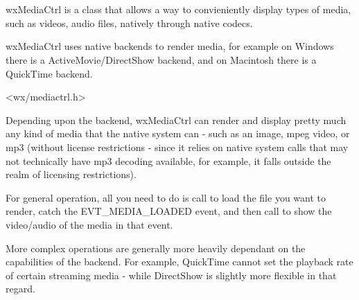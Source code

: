 
\section{}\label{wxmediactrl}

wxMediaCtrl is a class that allows a way to convieniently display types of 
media, such as videos, audio files, natively through native codecs.

wxMediaCtrl uses native backends to render media, for example on Windows
there is a ActiveMovie/DirectShow backend, and on Macintosh there is a 
QuickTime backend.




<wx/mediactrl.h>


\label{renderingmediawxmediactrl}

Depending upon the backend, wxMediaCtrl can render
and display pretty much any kind of media that the native system can - 
such as an image, mpeg video, or mp3 (without license restrictions -
since it relies on native system calls that may not technically
have mp3 decoding available, for example, it falls outside the
realm of licensing restrictions).

For general operation, all you need to do is call 
 to load the file
you want to render, catch the EVT\_MEDIA\_LOADED event,
and then call  
to show the video/audio of the media in that event.

More complex operations are generally more heavily dependant on the
capabilities of the backend.  For example, QuickTime cannot set
the playback rate of certain streaming media - while DirectShow is 
slightly more flexible in that regard.

\label{operationwxmediactrl}

